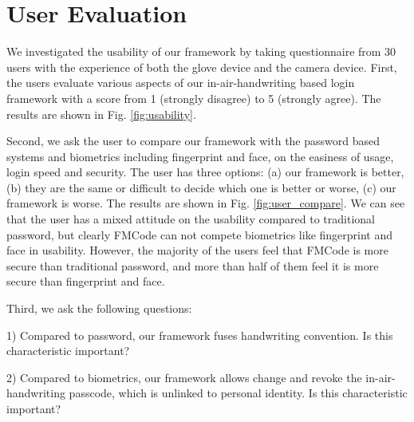 \documentclass[conference]{IEEEtran}
\begin{document}
\section{User Evaluation}

We investigated the usability of our framework by taking questionnaire from 30 users with the experience of both the glove device and the camera device. First, the users evaluate various aspects of our in-air-handwriting based login framework with a score from 1 (strongly disagree) to 5 (strongly agree). The results are shown in Fig. \ref{fig:usability}.



Second, we ask the user to compare our framework with the password based systems and biometrics including fingerprint and face, on the easiness of usage, login speed and security. The user has three options: (a) our framework is better, (b) they are the same or difficult to decide which one is better or worse, (c) our framework is worse. The results are shown in Fig. \ref{fig:user_compare}. We can see that the user has a mixed attitude on the usability compared to traditional password, but clearly FMCode can not compete biometrics like fingerprint and face in usability. However, the majority of the users feel that FMCode is more secure than traditional password, and more than half of them feel it is more secure than fingerprint and face.

Third, we ask the following questions:

1) Compared to password, our framework fuses handwriting convention. Is this characteristic important?

2) Compared to biometrics, our framework allows change and revoke the in-air-handwriting passcode, which is unlinked to personal identity. Is this characteristic important?
\end{document}
